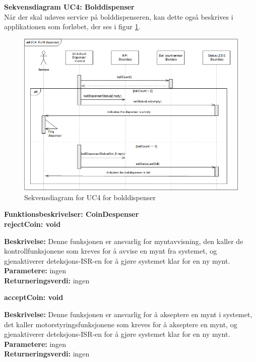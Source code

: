 \documentclass[Arkitektur/System_main.tex]{subfiles}
\begin{document}
\textbf{Sekvensdiagram UC4: Bolddispenser}\\
Når der skal udøves service på bolddispenseren, kan dette også beskrives i applikationen som forløbet, der ses i figur \ref{fig:seq_uc4_balldispenser}.
\begin{figure}[H]
    \centering
    \includegraphics[width=\textwidth]{Arkitektur/Softwarearkitektur/Applikationsmodel/BallDispenser/graphicsBallDispenser/sdUC4.png}
    \caption{Sekvensdiagram for UC4 for bolddispenser}
    \label{fig:seq_uc4_balldispenser}
\end{figure}
\newpage
{\large\textbf{Funktionsbeskrivelser: CoinDespenser}}\\[0.2cm]

\textbf {rejectCoin: void}
\begin{adjustwidth}{1cm}{0pt}
\textbf {Beskrivelse:} Denne funksjonen er ansvarlig for myntavvisning, den kaller de kontrollfunksjonene som kreves for å avvise en mynt fra systemet, og gjenaktiverer deteksjons-ISR-en for å gjøre systemet klar for en ny mynt. \\ [0.2cm]
\textbf {Parametere:} ingen \\ [0.2cm]
\textbf {Returneringsverdi:} ingen \\ [0.2cm]
\end{adjustwidth}

\textbf {acceptCoin: void}
\begin{adjustwidth}{1cm}{0pt}
\textbf {Beskrivelse:} Denne funksjonen er ansvarlig for å akseptere en mynt i systemet, det kaller motorstyringsfunksjonene som kreves for å akseptere en mynt, og gjenaktiverer deteksjons-ISR-en for å gjøre systemet klar for en ny mynt. \\ [0.2cm]
\textbf {Parametere:} ingen \\ [0.2cm]
\textbf {Returneringsverdi:} ingen \\ [0.2cm]
\end{adjustwidth}
\end{document}
